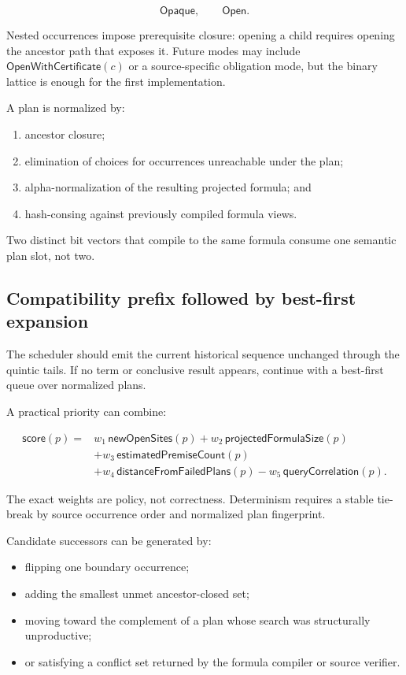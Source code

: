\documentclass[11pt]{article}
\begin{document}
\[
  \mathsf{Opaque},\qquad \mathsf{Open}.
\]

Nested occurrences impose prerequisite closure: opening a child requires
opening the ancestor path that exposes it.  Future modes may include
\(\mathsf{OpenWithCertificate}(c)\) or a source-specific obligation mode, but
the binary lattice is enough for the first implementation.

A plan is normalized by:

\begin{enumerate}
  \item ancestor closure;
  \item elimination of choices for occurrences unreachable under the plan;
  \item alpha-normalization of the resulting projected formula; and
  \item hash-consing against previously compiled formula views.
\end{enumerate}

Two distinct bit vectors that compile to the same formula consume one semantic
plan slot, not two.

\subsection{Compatibility prefix followed by best-first expansion}

The scheduler should emit the current historical sequence unchanged through
the quintic tails.  If no term or conclusive result appears, continue with a
best-first queue over normalized plans.

A practical priority can combine:

\[
\begin{aligned}
\mathsf{score}(p) ={}&
  w_1\,\mathsf{newOpenSites}(p)
 +w_2\,\mathsf{projectedFormulaSize}(p)\\
 &+w_3\,\mathsf{estimatedPremiseCount}(p)\\
 &+w_4\,\mathsf{distanceFromFailedPlans}(p)
 -w_5\,\mathsf{queryCorrelation}(p).
\end{aligned}
\]

The exact weights are policy, not correctness.  Determinism requires a stable
tie-break by source occurrence order and normalized plan fingerprint.

Candidate successors can be generated by:

\begin{itemize}
  \item flipping one boundary occurrence;
  \item adding the smallest unmet ancestor-closed set;
  \item moving toward the complement of a plan whose search was structurally
    unproductive;
  \item or satisfying a conflict set returned by the formula compiler or
    source verifier.
\end{itemize}
\end{document}
